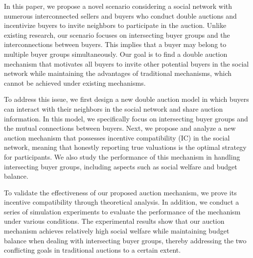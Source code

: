 In this paper, we propose a novel scenario considering a social network with numerous interconnected sellers and buyers who conduct double auctions and incentivize buyers to invite neighbors to participate in the auction. Unlike existing research, our scenario focuses on intersecting buyer groups and the interconnections between buyers. This implies that a buyer may belong to multiple buyer groups simultaneously. Our goal is to find a double auction mechanism that motivates all buyers to invite other potential buyers in the social network while maintaining the advantages of traditional mechanisms, which cannot be achieved under existing mechanisms.

To address this issue, we first design a new double auction model in which buyers can interact with their neighbors in the social network and share auction information. In this model, we specifically focus on intersecting buyer groups and the mutual connections between buyers. Next, we propose and analyze a new auction mechanism that possesses incentive compatibility (IC) in the social network, meaning that honestly reporting true valuations is the optimal strategy for participants. We also study the performance of this mechanism in handling intersecting buyer groups, including aspects such as social welfare and budget balance.

To validate the effectiveness of our proposed auction mechanism, we prove its incentive compatibility through theoretical analysis. In addition, we conduct a series of simulation experiments to evaluate the performance of the mechanism under various conditions. The experimental results show that our auction mechanism achieves relatively high social welfare while maintaining budget balance when dealing with intersecting buyer groups, thereby addressing the two conflicting goals in traditional auctions to a certain extent.
